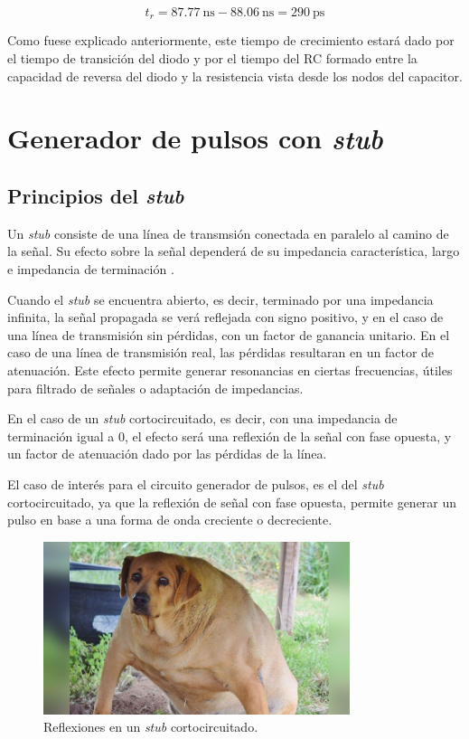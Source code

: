 \begin{equation}
    t_r = \qty{87.77}{\nano\second} - \qty{88.06}{\nano\second} =
    \qty{290}{\pico\second}
\end{equation}

Como fuese explicado anteriormente, este
tiempo de crecimiento estará dado por el tiempo de transición del diodo y por el
tiempo del RC formado entre la capacidad de reversa del diodo y la resistencia
vista desde los nodos del capacitor.

\section{Generador de pulsos con \textit{stub}}
\label{sec:generador_pulsos_stub}

\subsection{Principios del \textit{stub}}

Un \textit{stub} consiste de una línea de transmsión conectada en paralelo al
camino de la señal. Su efecto sobre la señal dependerá de su impedancia
característica, largo e impedancia de terminación \cite{pozar2011}.

Cuando el \textit{stub} se encuentra abierto, es decir, terminado por una
impedancia infinita, la señal propagada se verá reflejada con signo positivo, y
en el caso de una línea de transmisión sin pérdidas, con un factor de ganancia
unitario. En el caso de una línea de transmisión real, las pérdidas resultaran
en un factor de atenuación. Este efecto permite generar
resonancias en ciertas frecuencias, útiles para filtrado de señales o adaptación
de impedancias.

En el caso de un \textit{stub} cortocircuitado, es decir, con una impedancia de
terminación igual a $0$, el efecto será una reflexión de la señal con fase
opuesta, y un factor de atenuación dado por las pérdidas de la línea.

El caso de interés para el circuito generador de pulsos, es el del \textit{stub}
cortocircuitado, ya que la reflexión de señal con fase opuesta, permite generar
un pulso en base a una forma de onda creciente o decreciente.

\begin{figure}[tbp]
    \centering
    \includegraphics[width=0.8\textwidth]{images/placeholder.jpg}
    \caption{Reflexiones en un \textit{stub} cortocircuitado.}
    \label{fig:stub_time_domain_waveforms}
\end{figure}

